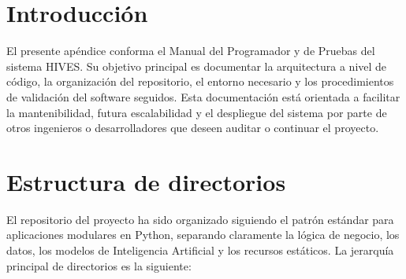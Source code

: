 
\section{Introducción}
El presente apéndice conforma el Manual del Programador y de Pruebas del sistema HIVES. Su objetivo principal es documentar la arquitectura a nivel de código, la organización del repositorio, el entorno necesario y los procedimientos de validación del software seguidos. Esta documentación está orientada a facilitar la mantenibilidad, futura escalabilidad y el despliegue del sistema por parte de otros ingenieros o desarrolladores que deseen auditar o continuar el proyecto.

\section{Estructura de directorios}
El repositorio del proyecto ha sido organizado siguiendo el patrón estándar para aplicaciones modulares en Python, separando claramente la lógica de negocio, los datos, los modelos de Inteligencia Artificial y los recursos estáticos. La jerarquía principal de directorios es la siguiente:


